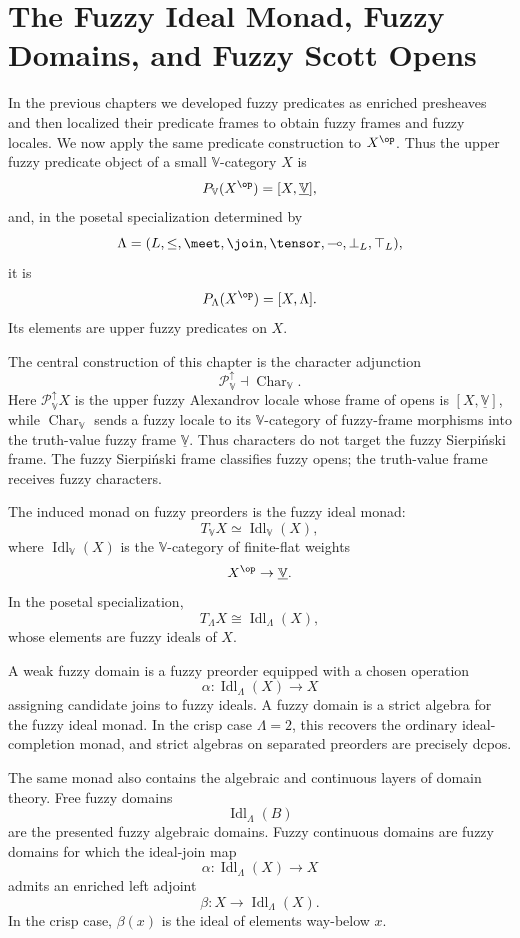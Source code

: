 \chapter{The Fuzzy Ideal Monad, Fuzzy Domains, and Fuzzy Scott Opens}
\label{ch:fuzzy-ideal-monad-domains-scott}

In the previous chapters we developed fuzzy predicates as enriched presheaves and
then localized their predicate frames to obtain fuzzy frames and fuzzy locales.  We
now apply the same predicate construction to \(X^{\op}\).  Thus the upper fuzzy
predicate object of a small \(\mathbb V\)-category \(X\) is
\[
    P_{\mathbb V}(X^{\op})
    =
    [X,\underline{\mathbb V}],
\]
and, in the posetal specialization determined by
\[
    \Lambda=(L,\leq,\meet,\join,\tensor,\multimap,\bot_L,\top_L),
\]
it is
\[
    P_\Lambda(X^{\op})
    =
    [X,\Lambda].
\]
Its elements are upper fuzzy predicates on \(X\).

The central construction of this chapter is the character adjunction
\[
    \mathcal P_{\mathbb V}^{\uparrow}
    \dashv
    \operatorname{Char}_{\mathbb V}.
\]
Here \(\mathcal P_{\mathbb V}^{\uparrow}X\) is the upper fuzzy Alexandrov locale
whose frame of opens is \([X,\underline{\mathbb V}]\), while
\(\operatorname{Char}_{\mathbb V}\) sends a fuzzy locale to its
\(\mathbb V\)-category of fuzzy-frame morphisms into the truth-value fuzzy frame
\(\underline{\mathbb V}\).  Thus characters do not target the fuzzy Sierpiński
frame.  The fuzzy Sierpiński frame classifies fuzzy opens; the truth-value frame
receives fuzzy characters.

The induced monad on fuzzy preorders is the fuzzy ideal monad:
\[
    T_{\mathbb V}X
    \simeq
    \operatorname{Idl}_{\mathbb V}(X),
\]
where \(\operatorname{Idl}_{\mathbb V}(X)\) is the \(\mathbb V\)-category of
finite-flat weights
\[
    X^{\op}\to\underline{\mathbb V}.
\]
In the posetal specialization,
\[
    T_\Lambda X
    \cong
    \operatorname{Idl}_\Lambda(X),
\]
whose elements are fuzzy ideals of \(X\).

A weak fuzzy domain is a fuzzy preorder equipped with a chosen operation
\[
    \alpha:\operatorname{Idl}_\Lambda(X)\to X
\]
assigning candidate joins to fuzzy ideals.  A fuzzy domain is a strict algebra for
the fuzzy ideal monad.  In the crisp case \(\Lambda=2\), this recovers the ordinary
ideal-completion monad, and strict algebras on separated preorders are precisely
dcpos.

The same monad also contains the algebraic and continuous layers of domain theory.
Free fuzzy domains
\[
    \operatorname{Idl}_\Lambda(B)
\]
are the presented fuzzy algebraic domains.  Fuzzy continuous domains are fuzzy
domains for which the ideal-join map
\[
    \alpha:\operatorname{Idl}_\Lambda(X)\to X
\]
admits an enriched left adjoint
\[
    \beta:X\to\operatorname{Idl}_\Lambda(X).
\]
In the crisp case, \(\beta(x)\) is the ideal of elements way-below \(x\).

